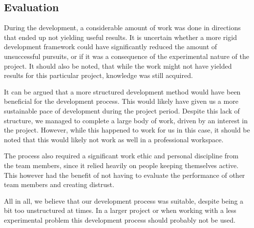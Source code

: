 \subsection{Evaluation}
During the development, a considerable amount of work was done in directions that ended up not yielding useful results. It is uncertain whether a more rigid development framework could have significantly reduced the amount of unsuccessful pursuits, or if it was a consequence of the experimental nature of the project. It should also be noted, that while the work might not have yielded results for this particular project, knowledge was still acquired.

It can be argued that a more structured development method would have been beneficial for the development process. This would likely have given us a more sustainable pace of development during the project period.
Despite this lack of structure, we managed to complete a large body of work, driven by an interest in the project. However, while this happened to work for us in this case, it should be noted that this would likely not work as well in a professional workspace.

The process also required a significant work ethic and personal discipline from the team members, since it relied heavily on people keeping themselves active. This however had the benefit of not having to evaluate the performance of other team members and creating distrust.

All in all, we believe that our development process was suitable, despite being a bit too unstructured at times. In a larger project or when working with a less experimental problem this development process should probably not be used.



